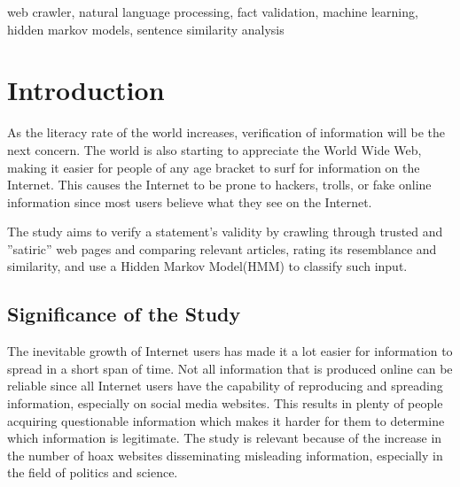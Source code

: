 \documentclass[journal]{./IEEEtran}
\title{\SPTITLE}
\author{\ADVISEE~and~\ADVISER%
	\REMARK
}
\begin{document}
    
	
	\maketitle
	
	\begin{abstract}
		The Internet's ecosystem grows every second, and with it comes new information that might not be reliable or accurate. One of the biggest problems people face when surfing the Internet is information fabrication. Although possibly unintentional, the need to validate such statements is necessary. This paper presents an application that crawls through various reliable and satiric websites for information and matches statements to assess its validity. With over 5,000 news articles, a Hidden Markov Model (HMM) was used to structure relevant information depending on the user's input to be evaluated for its category: verified, satiric, or unverified.
	\end{abstract}
	
	\begin{keywords}
		web crawler, natural language processing, fact validation, machine learning, hidden markov models, sentence similarity analysis
	\end{keywords}
	
	\section{Introduction}
	As the literacy rate of the world increases, verification
	of information will be the next concern. The world is also
	starting to appreciate the World Wide Web, making it easier for people of any age bracket to surf for information on the Internet. This causes the Internet to be prone to hackers, trolls, or fake online information since most users believe what they see on the Internet.
	
	The study aims to verify a statement's validity by crawling
	through trusted and ''satiric'' web pages and comparing relevant articles, rating its resemblance and similarity, and use a Hidden Markov Model(HMM) to classify such input.
	
	\subsection{Significance of the Study}
	The inevitable growth of Internet users has made it a lot easier for information to spread in a short span of time. Not all information that is produced online can be reliable since all Internet users have the capability of reproducing and spreading information, especially on social media websites. This results in plenty of people acquiring questionable information which makes it harder for them to determine which information is legitimate. The study is relevant because of the increase in the number of hoax websites disseminating misleading information, especially in the field of politics and science.
	
\end{document}
